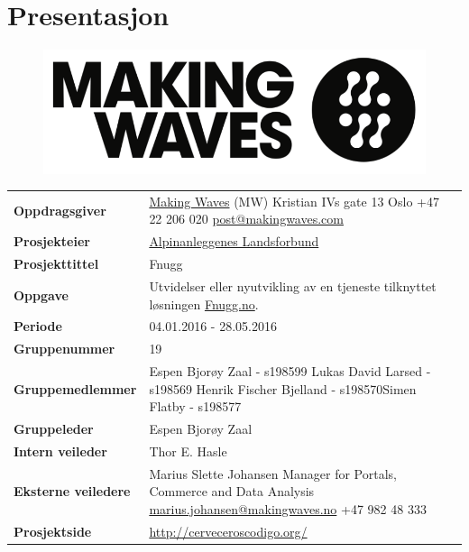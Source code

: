 \chapter{Presentasjon}
\begin{figure}[ht]
\includegraphics[scale=0.15, keepaspectratio]{./img/presentasjon/mw_logo.png}
\end{figure}
\begin{flushleft}
\renewcommand{\arraystretch}{1.5}
\begin{tabular}[ht]{@{}lp{100mm}@{}}
\textbf{Oppdragsgiver} & \href{http://www.makingwaves.no/}{Making Waves} 
(MW) \newline Kristian IVs gate 13 \newline 0164 Oslo \newline +47 22 206 020 \newline \href{mailto:post@makingwaves.com}{post@makingwaves.com} \\
\textbf{Prosjekteier} & \href{http://www.alpinanleggene.no/}{Alpinanleggenes Landsforbund} \\
\textbf{Prosjekttittel} & Fnugg \\ 
\textbf{Oppgave} & Utvidelser eller nyutvikling av en tjeneste tilknyttet løsningen \href{http://www.fnugg.no/}{Fnugg.no}. \\ 
\textbf{Periode} & 04.01.2016 - 28.05.2016 \\ 
\textbf{Gruppenummer} & 19 \\ 
\textbf{Gruppemedlemmer} & Espen Bjorøy Zaal - s198599 \newline Lukas David Larsed - s198569 \newline Henrik Fischer Bjelland - s198570\newline Simen Flatby - s198577 \\ 
\textbf{Gruppeleder} & Espen Bjorøy Zaal \\ 
\textbf{Intern veileder} & Thor E. Hasle \\ 
\textbf{Eksterne veiledere} & Marius Slette Johansen \newline Manager for Portals, Commerce and Data Analysis \newline \href{mailto:marius.johansen@makingwaves.no}{marius.johansen@makingwaves.no} \newline +47 982 48 333 \\
\textbf{Prosjektside} & \url{http://cerveceroscodigo.org/} \\
\end{tabular} 
\end{flushleft}

